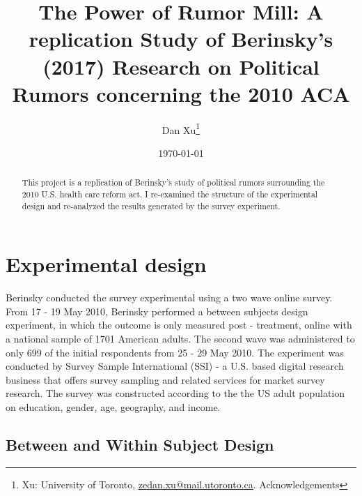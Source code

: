 \documentclass[AER]{AEA}
\begin{document}
\title{The Power of Rumor Mill: A replication Study of Berinsky's (2017)
Research on Political Rumors concerning the 2010 ACA}


\author{
  Dan Xu\thanks{
  Xu: University of
Toronto, \href{mailto:zedan.xu@mail.utoronto.ca}{zedan.xu@mail.utoronto.ca}.
  Acknowledgements
}
}

\date{\today}

\begin{abstract}
This project is a replication of Berinsky's study of political rumors
surrounding the 2010 U.S. health care reform act. I re-examined the
structure of the experimental design and re-analyzed the results
generated by the survey experiment.
\end{abstract}


\maketitle

\hypertarget{experimental-design}{%
\section{Experimental design}\label{experimental-design}}

Berinsky conducted the survey experimental using a two wave online
survey. From 17 - 19 May 2010, Berinsky performed a between subjects
design experiment, in which the outcome is only measured post -
treatment, online with a national sample of 1701 American adults. The
second wave was administered to only 699 of the initial respondents from
25 - 29 May 2010. The experiment was conducted by Survey Sample
International (SSI) - a U.S. based digital research business that offers
survey sampling and related services for market survey research. The
survey was constructed according to the the US adult population on
education, gender, age, geography, and income.

\hypertarget{between-and-within-subject-design}{%
\subsection{Between and Within Subject
Design}\label{between-and-within-subject-design}}
\end{document}
